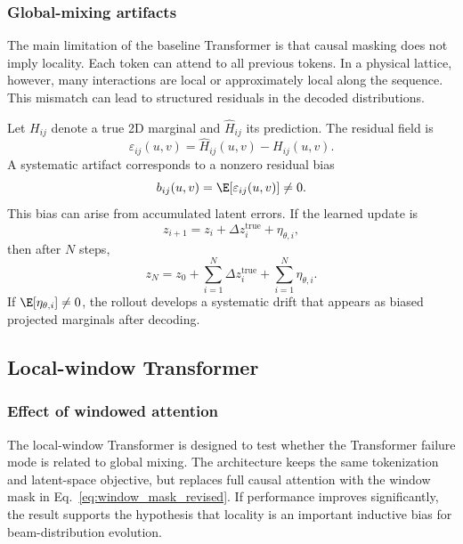 
\subsubsection{Global-mixing artifacts}
The main limitation of the baseline Transformer is that causal masking does not imply locality. Each token can attend to all previous tokens. In a physical lattice, however, many interactions are local or approximately local along the sequence. This mismatch can lead to structured residuals in the decoded distributions.

Let $H_{ij}$ denote a true 2D marginal and $\widehat{H}_{ij}$ its prediction. The residual field is
\begin{equation}
    \varepsilon_{ij}(u,v)=\widehat{H}_{ij}(u,v)-H_{ij}(u,v).
\end{equation}
A systematic artifact corresponds to a nonzero residual bias
\begin{equation}
    b_{ij}(u,v)=\E[\varepsilon_{ij}(u,v)]\neq 0.
    \label{eq:residual_bias_revised}
\end{equation}
This bias can arise from accumulated latent errors. If the learned update is
\begin{equation}
    z_{i+1}=z_i+\Delta z_i^{\mathrm{true}}+\eta_{\theta,i},
\end{equation}
then after $N$ steps,
\begin{equation}
    z_N=z_0+\sum_{i=1}^{N}\Delta z_i^{\mathrm{true}}+\sum_{i=1}^{N}\eta_{\theta,i}.
\end{equation}
If $\E[\eta_{\theta,i}]\neq 0$, the rollout develops a systematic drift that appears as biased projected marginals after decoding.


\subsection{Local-window Transformer}
\subsubsection{Effect of windowed attention}
The local-window Transformer is designed to test whether the Transformer failure mode is related to global mixing. The architecture keeps the same tokenization and latent-space objective, but replaces full causal attention with the window mask in Eq.~\eqref{eq:window_mask_revised}. If performance improves significantly, the result supports the hypothesis that locality is an important inductive bias for beam-distribution evolution.

